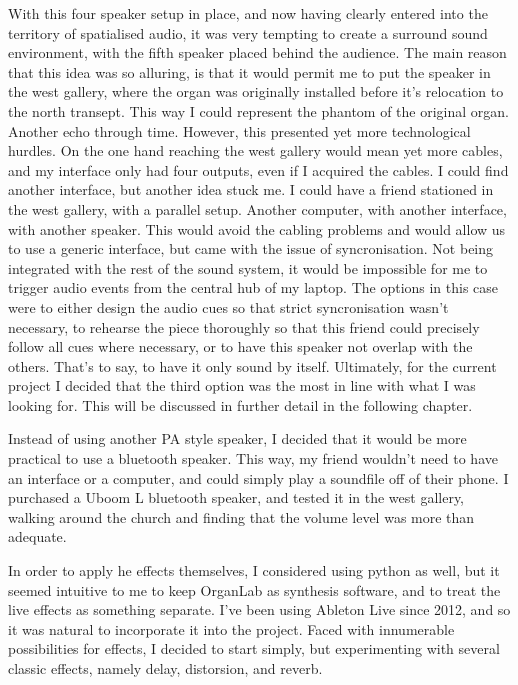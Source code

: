 \documentclass[12pt,twoside,maitrise]{dms_ks}
\theoremstyle{definition}
\begin{document}
{With this four speaker setup in place, and now having clearly entered into the territory of spatialised audio, it was very tempting to create a surround sound environment, with the fifth speaker placed behind the audience. 
The main reason that this idea was so alluring, is that it would permit me to put the speaker in the west gallery, where the organ was originally installed before it's relocation to the north transept. 
This way I could represent the phantom of the original organ. 
Another echo through time. 
However, this presented yet more technological hurdles. 
On the one hand reaching the west gallery would mean yet more cables, and my interface only had four outputs, even if I acquired the cables. 
I could find another interface, but another idea stuck me. 
I could have a friend stationed in the west gallery, with a parallel setup. 
Another computer, with another interface, with another speaker. 
This would avoid the cabling problems and would allow us to use a generic interface, but came with the issue of syncronisation. 
Not being integrated with the rest of the sound system, it would be impossible for me to trigger audio events from the central hub of my laptop. 
The options in this case were to either design the audio cues so that strict syncronisation wasn't necessary, to rehearse the piece thoroughly so that this friend could precisely follow all cues where necessary, or to have this speaker not overlap with the others. 
That's to say, to have it only sound by itself. 
Ultimately, for the current project I decided that the third option was the most in line with what I was looking for. 
This will be discussed in further detail in the following chapter. 

Instead of using another PA style speaker, I decided that it would be more practical to use a bluetooth speaker. 
This way, my friend wouldn't need to have an interface or a computer, and could simply play a soundfile off of their phone. 
I purchased a Uboom L bluetooth speaker, and tested it in the west gallery, walking around the church and finding that the volume level was more than adequate. 


In order to apply he effects themselves, I considered using python as well, but it seemed intuitive to me to keep OrganLab as synthesis software, and to treat the live effects as something separate. 
I've been using Ableton Live since 2012, and so it was natural to incorporate it into the project. 
Faced with innumerable possibilities for effects, I decided to start simply, but experimenting with several classic effects, namely delay, distorsion, and reverb. 

}
\end{document}
